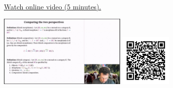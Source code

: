 
\begin{minipage}{10cm}
    \href{https://act4e-spring21.netlify.app/videos/spring2021-monads-b:comparing-perspectives.html}{Watch online video (5 minutes).}
        
    \href{https://act4e-spring21.netlify.app/videos/spring2021-monads-b:comparing-perspectives.html}{\includegraphics[height=3.5cm]{spring2021-monads-b:comparing-perspectives/thumbnails.jpg}}
    \href{https://act4e-spring21.netlify.app/videos/spring2021-monads-b:comparing-perspectives.html}{\includegraphics[height=2.5cm]{spring2021-monads-b:comparing-perspectives/qrcode.png}}
\end{minipage}
